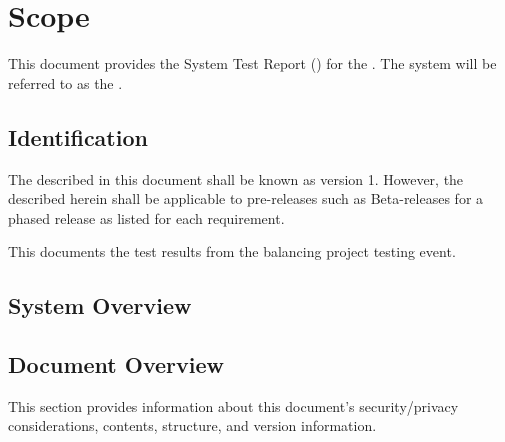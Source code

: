 
\chapter{Scope}
\label{loc:Scope}


This document provides the System Test Report (\STR) for the \ThisSystem. 
The system will be referred to as the \ThisSys.

\section{Identification}
\label{loc:Identification}


The \ThisSystem described in this document shall be known as \ThisSys version 1.
However, the \STR described herein shall be applicable to pre-releases such as Beta-releases for a phased release as listed for each requirement.

This \STR documents the test results from the balancing project testing event.

\section{System Overview}
\label{loc:SystemOverview}






\section{Document Overview}
\label{loc:DocumentOverview}


This section provides information about this document's security/privacy considerations, contents, structure, and version information.

% 

% 

% 
